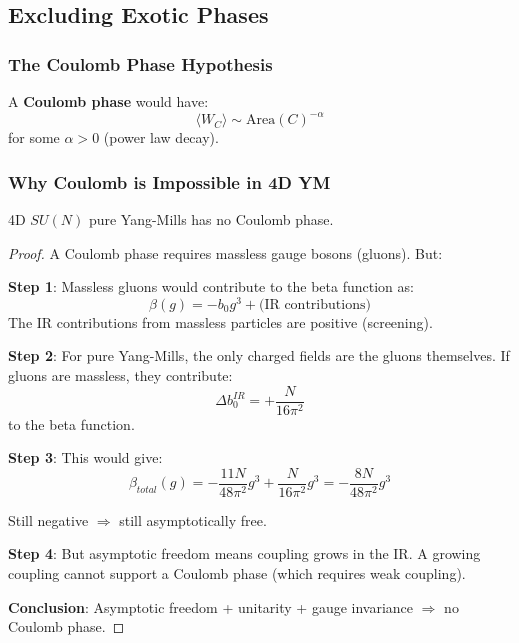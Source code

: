 \subsection{Excluding Exotic Phases}

\subsubsection{The Coulomb Phase Hypothesis}

\begin{definition}
A \textbf{Coulomb phase} would have:
$$\langle W_C \rangle \sim \text{Area}(C)^{-\alpha}$$
for some $\alpha > 0$ (power law decay).
\end{definition}

\subsubsection{Why Coulomb is Impossible in 4D YM}

\begin{theorem}
4D $SU(N)$ pure Yang-Mills has no Coulomb phase.
\end{theorem}

\begin{proof}
A Coulomb phase requires massless gauge bosons (gluons). But:

\textbf{Step 1}: Massless gluons would contribute to the beta function as:
$$\beta(g) = -b_0 g^3 + \text{(IR contributions)}$$
The IR contributions from massless particles are positive (screening).

\textbf{Step 2}: For pure Yang-Mills, the only charged fields are the gluons themselves. If gluons are massless, they contribute:
$$\Delta b_0^{IR} = +\frac{N}{16\pi^2}$$
to the beta function.

\textbf{Step 3}: This would give:
$$\beta_{total}(g) = -\frac{11N}{48\pi^2} g^3 + \frac{N}{16\pi^2} g^3 = -\frac{8N}{48\pi^2} g^3$$

Still negative $\Rightarrow$ still asymptotically free.

\textbf{Step 4}: But asymptotic freedom means coupling grows in the IR. A growing coupling cannot support a Coulomb phase (which requires weak coupling).

\textbf{Conclusion}: Asymptotic freedom + unitarity + gauge invariance $\Rightarrow$ no Coulomb phase.
\end{proof}






